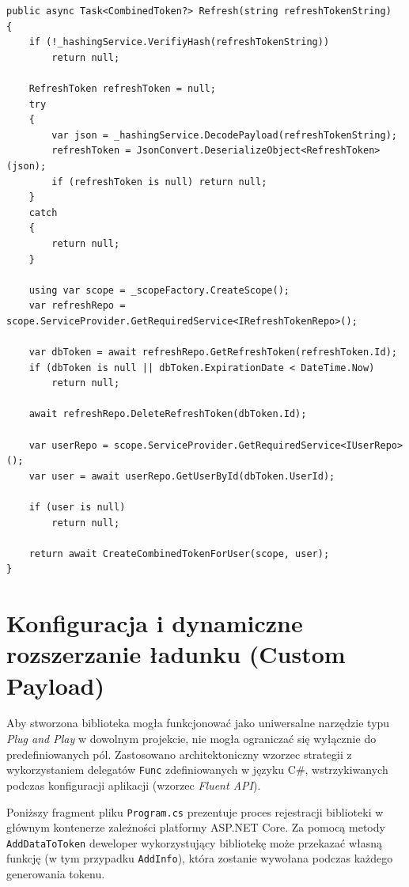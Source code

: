 \documentclass{SGGW-thesis}
\begin{document}
\begin{minipage}{\textwidth}
\begin{lstlisting}    
public async Task<CombinedToken?> Refresh(string refreshTokenString)
{
    if (!_hashingService.VerifiyHash(refreshTokenString))
        return null;

    RefreshToken refreshToken = null;
    try
    {
        var json = _hashingService.DecodePayload(refreshTokenString);
        refreshToken = JsonConvert.DeserializeObject<RefreshToken>(json);
        if (refreshToken is null) return null;
    }
    catch
    {
        return null;
    }

    using var scope = _scopeFactory.CreateScope();
    var refreshRepo = scope.ServiceProvider.GetRequiredService<IRefreshTokenRepo>();
    
    var dbToken = await refreshRepo.GetRefreshToken(refreshToken.Id);
    if (dbToken is null || dbToken.ExpirationDate < DateTime.Now)
        return null;
        
    await refreshRepo.DeleteRefreshToken(dbToken.Id);

    var userRepo = scope.ServiceProvider.GetRequiredService<IUserRepo>();
    var user = await userRepo.GetUserById(dbToken.UserId);

    if (user is null)
        return null;

    return await CreateCombinedTokenForUser(scope, user);
}
\end{lstlisting}
\end{minipage}

\clearpage

\section{Konfiguracja i dynamiczne rozszerzanie ładunku (Custom Payload)}

Aby stworzona biblioteka mogła funkcjonować jako uniwersalne narzędzie typu \textit{Plug and Play} w dowolnym projekcie, nie mogła ograniczać się wyłącznie do predefiniowanych pól. Zastosowano architektoniczny wzorzec strategii z wykorzystaniem delegatów \texttt{Func} zdefiniowanych w języku C\#, wstrzykiwanych podczas konfiguracji aplikacji (wzorzec \textit{Fluent API}).

Poniższy fragment pliku \texttt{Program.cs} prezentuje proces rejestracji biblioteki w głównym kontenerze zależności platformy ASP.NET Core. Za pomocą metody \texttt{AddDataToToken} deweloper wykorzystujący bibliotekę może przekazać własną funkcję (w tym przypadku \texttt{AddInfo}), która zostanie wywołana podczas każdego generowania tokenu. 
\end{document}
